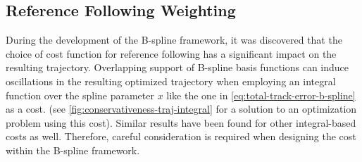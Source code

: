\subsection{Reference Following Weighting}\label{sec:oscillations}
During the development of the B-spline framework, it was discovered that the choice of cost function for reference following has a significant impact on the resulting trajectory. Overlapping support of B-spline basis functions can induce oscillations in the resulting optimized trajectory when employing an integral function over the spline parameter $x$ like the one in \cref{eq:total-track-error-b-spline} as a cost. (see \cref{fig:conservativeness-traj-integral} for a solution to an optimization problem using this cost). Similar results have been found for other integral-based costs as well. Therefore, careful consideration is required when designing the cost within the B-spline framework.

